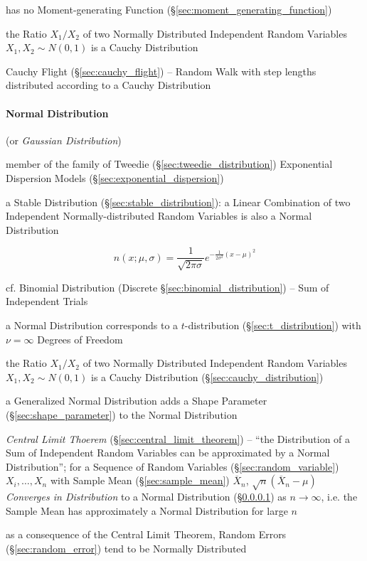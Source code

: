 has no Moment-generating Function (\S\ref{sec:moment_generating_function})

the Ratio $X_1/X_2$ of two Normally Distributed Independent Random Variables
$X_1, X_2 \sim N(0,1)$ is a Cauchy Distribution

Cauchy Flight (\S\ref{sec:cauchy_flight}) -- Random Walk with step lengths
distributed according to a Cauchy Distribution



\paragraph{Normal Distribution}\label{sec:normal_distribution}\hfill

(or \emph{Gaussian Distribution})

member of the family of Tweedie (\S\ref{sec:tweedie_distribution}) Exponential
Dispersion Models (\S\ref{sec:exponential_dispersion})

a Stable Distribution (\S\ref{sec:stable_distribution}): a Linear Combination of
two Independent Normally-distributed Random Variables is also a Normal
Distribution

\[
  n (x; \mu, \sigma) =
  \frac{1}{\sqrt{2\pi \sigma}} e^{-\frac{1}{2 \sigma^2}(x - \mu)^2}
\]

cf. Binomial Distribution (Discrete \S\ref{sec:binomial_distribution})
-- Sum of Independent Trials

a Normal Distribution corresponds to a $t$-distribution
(\S\ref{sec:t_distribution}) with $\nu = \infty$ Degrees of Freedom

the Ratio $X_1/X_2$ of two Normally Distributed Independent Random Variables
$X_1, X_2 \sim N(0,1)$ is a Cauchy Distribution
(\S\ref{sec:cauchy_distribution})

\fist a Generalized Normal Distribution adds a Shape Parameter
(\S\ref{sec:shape_parameter}) to the Normal Distribution

\emph{Central Limit Thoerem} (\S\ref{sec:central_limit_theorem}) -- ``the
Distribution of a Sum of Independent Random Variables can be approximated by a
Normal Distribution'';
for a Sequence of Random Variables (\S\ref{sec:random_variable})
$X_i, \ldots, X_n$ with Sample Mean (\S\ref{sec:sample_mean})
$\overline{X}_n$, $\sqrt{n}(\overline{X}_n - \mu)$
\emph{Converges in Distribution} to a Normal Distribution
(\S\ref{sec:normal_distribution}) as $n \to \infty$, i.e. the Sample
Mean has approximately a Normal Distribution for large $n$

as a consequence of the Central Limit Theorem, Random Errors
(\S\ref{sec:random_error}) tend to be Normally Distributed

